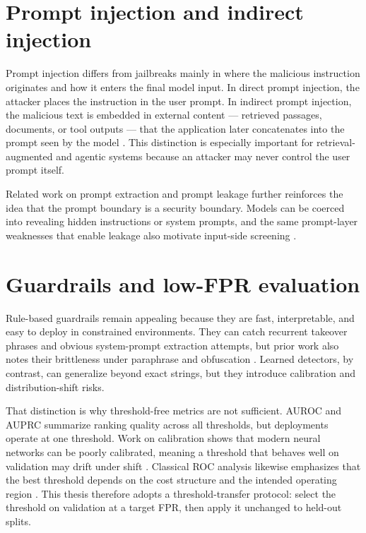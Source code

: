 \section{Prompt injection and indirect injection}

Prompt injection differs from jailbreaks mainly in where the malicious instruction originates and how it enters the final model input. In direct prompt injection, the attacker places the instruction in the user prompt. In indirect prompt injection, the malicious text is embedded in external content --- retrieved passages, documents, or tool outputs --- that the application later concatenates into the prompt seen by the model \cite{abdelnabi2023promptinjection}. This distinction is especially important for retrieval-augmented and agentic systems because an attacker may never control the user prompt itself.

Related work on prompt extraction and prompt leakage further reinforces the idea that the prompt boundary is a security boundary. Models can be coerced into revealing hidden instructions or system prompts, and the same prompt-layer weaknesses that enable leakage also motivate input-side screening \cite{zhang2023effectivepromptextraction}.

\section{Guardrails and low-FPR evaluation}

Rule-based guardrails remain appealing because they are fast, interpretable, and easy to deploy in constrained environments. They can catch recurrent takeover phrases and obvious system-prompt extraction attempts, but prior work also notes their brittleness under paraphrase and obfuscation \cite{rababah2024sokprompthacking,chao2024jailbreakbench}. Learned detectors, by contrast, can generalize beyond exact strings, but they introduce calibration and distribution-shift risks.

That distinction is why threshold-free metrics are not sufficient. AUROC and AUPRC summarize ranking quality across all thresholds, but deployments operate at one threshold. Work on calibration shows that modern neural networks can be poorly calibrated, meaning a threshold that behaves well on validation may drift under shift \cite{guo2017calibration}. Classical ROC analysis likewise emphasizes that the best threshold depends on the cost structure and the intended operating region \cite{fawcett2006roc}. This thesis therefore adopts a threshold-transfer protocol: select the threshold on validation at a target FPR, then apply it unchanged to held-out splits.


